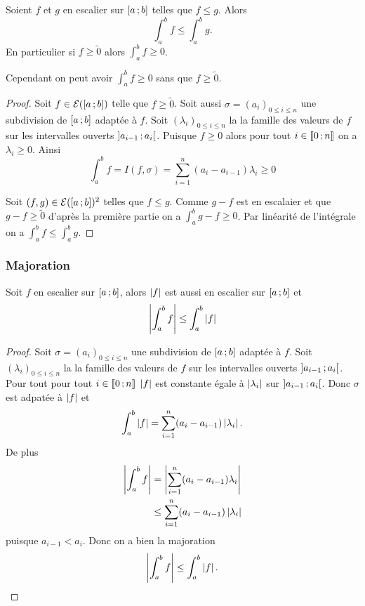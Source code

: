 \begin{prop}
  Soient $f$ et $g$ en escalier sur $\left[ a \, ;  b \right]$ telles que $f \leq g$. Alors
  \begin{equation}
    \int_a^b f \leq \int_a^b g.
  \end{equation}
  En particulier si $f\geq \tilde{0}$ alors $\int_a^b f \geq 0$.
\end{prop}
Cependant on peut avoir $\int_a^b f \geq 0$ sans que $f \geq \tilde{0}$.
\begin{proof}
  Soit $f \in \mathcal{E}(\left[ a \, ;  b \right])$ telle que $f \geq \tilde{0}$. Soit aussi $\sigma=(a_i)_{0 \leq i \leq n}$ une subdivision de $\left[ a \, ;  b \right]$ adaptée à $f$. Soit $(\lambda_i)_{0 \leq i \leq n}$ la la famille des valeurs de $f$ sur les intervalles ouverts $\left] a_{i-1} \, ;  a_i \right[$. Puisque $f \geq 0$ alors pour tout $i \in \mathopen{\llbracket}0\mathclose{}\mathpunct{};n\mathclose{\rrbracket}$ on a $\lambda_i \geq 0$. Ainsi
  \begin{equation}
    \int_a^b f = I(f,\sigma)=\sum_{i=1}^n(a_i-a_{i-1})\lambda_i \geq 0
  \end{equation}

   Soit $(f,g) \in \mathcal{E}(\left[ a \, ;  b \right])^2$ telles que $f \leq g$. Comme $g-f$ est en escalaier et que $g-f \geq \tilde{0}$ d'après la première partie on a $\int_a^b g-f \geq 0$. Par linéarité de l'intégrale on a $\int_a^b f \leq \int_a^b g$.
\end{proof}

\subsubsection{Majoration}

\begin{prop}
  Soit $f$ en escalier sur $\left[ a \, ;  b \right]$, alors $\left\lvert f\right\rvert$ est aussi en escalier sur $\left[ a \, ;  b \right]$ et
  \begin{equation}
    \left\lvert\int_a^b f\right\rvert \leq \int_a^b \left\lvert f\right\rvert
  \end{equation}
\end{prop}
\begin{proof}
  Soit $\sigma=(a_i)_{0 \leq i \leq n}$ une subdivision de $\left[ a \, ;  b \right]$ adaptée à $f$. Soit $(\lambda_i)_{0 \leq i \leq n}$ la la famille des valeurs de $f$ sur les intervalles ouverts $\left] a_{i-1} \, ;  a_i \right[$. Pour tout pour tout $i \in \mathopen{\llbracket}0\mathclose{}\mathpunct{};n\mathclose{\rrbracket}$ $\left\lvert f\right\rvert$ est constante égale à $\left\lvert\lambda_i\right\rvert$ sur $\left] a_{i-1} \, ;  a_i \right[$. Donc $\sigma$ est adpatée à $\left\lvert f\right\rvert$ et
  \begin{equation}
    \int_a^b \left\lvert f\right\rvert = \sum_{i=1}^n (a_i-a_{i-1})\left\lvert\lambda_i\right\rvert.
  \end{equation}
  De plus
  \begin{align}
    \left\lvert\int_a^b f\right\rvert &= \left\lvert\sum_{i=1}^n (a_i-a_{i-1})\lambda_i\right\rvert\\
      &\leq \sum_{i=1}^n (a_i-a_{i-1})\left\lvert\lambda_i\right\rvert
  \end{align}
  puisque $a_{i-1} < a_i$. Donc on a bien la majoration
  \begin{equation}
    \left\lvert\int_a^b f\right\rvert \leq \int_a^b \left\lvert f\right\rvert.
  \end{equation}
\end{proof}

